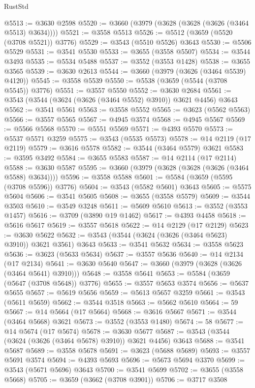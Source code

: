 \begin{lexlean}{RustStd}
\begin{coremodule}
@5513 := @3630 @2598
@5520 := @3660 (@3979 (@3628 (@3628 (@3626 (@3464 @5513) @3634))))
@5521 := @3558 @5513
@5526 := @5512 (@3659 (@5520 (@3708 @5521)) @3776)
@5529 := @3543 (@5510 @5526) @3643
@5530 := @5506 @5529
@5531 := @3541 @5530
@5533 := @3655 (@3558 @5507)
@5534 := @3544 @3493
@5535 := @5534 @5488
@5537 := @3552 (@3553 @1428)
@5538 := @3655 @3565
@5539 := @3630 @2613
@5544 := @3660 (@3979 (@3626 (@3464 @5539) @4120))
@5545 := @3558 @5539
@5550 := @5538 (@3659 (@5544 (@3708 @5545)) @3776)
@5551 := @3557 @5550
@5552 := @3630 @2684
@5561 := @3543 (@3544 (@3624 (@3626 (@3464 @5552) @3910)) @3621 @4456) @3643
@5562 := @3541 @5561
@5563 := @3558 @5552
@5565 := @3623 (@5562 @5563)
@5566 := @3557 @5565
@5567 := @4945 @3574
@5568 := @4945 @5567
@5569 := @5566 @5568
@5570 := @5551 @5569
@5571 := @4393 @5570
@5573 := @5537 @5571 @3259
@5575 := @3543 (@5535 @5573)
@5578 := @14 @2119 (@17 @2119)
@5579 := @3616 @5578
@5582 := @3544 (@3464 @5579) @3621
@5583 := @3595 @3492
@5584 := @3655 @5583
@5587 := @14 @2114 (@17 @2114)
@5588 := @3630 @5587
@5595 := @3660 (@3979 (@3628 (@3628 (@3626 (@3464 @5588) @3634))))
@5596 := @3558 @5588
@5601 := @5584 (@3659 (@5595 (@3708 @5596)) @3776)
@5604 := @3543 (@5582 @5601) @3643
@5605 := @5575 @5604
@5606 := @3541 @5605
@5608 := @3655 (@3558 @5579)
@5609 := @3544 @3503
@5610 := @3549 @3248
@5611 := @5609 @5610
@5613 := @3552 (@3553 @1457)
@5616 := @3709 (@3890 @19 @1462)
@5617 := @4393 @4458
@5618 := @5616 @5617
@5619 := @3557 @5618
@5622 := @14 @2129 (@17 @2129)
@5623 := @3630 @5622
@5632 := @3543 (@3544 (@3624 (@3626 (@3464 @5623) @3910)) @3621 @3561) @3643
@5633 := @3541 @5632
@5634 := @3558 @5623
@5636 := @3623 (@5633 @5634)
@5637 := @3557 @5636
@5640 := @14 @2134 (@17 @2134)
@5641 := @3630 @5640
@5647 := @3660 (@3979 (@3628 (@3626 (@3464 @5641) @3910)))
@5648 := @3558 @5641
@5653 := @5584 (@3659 (@5647 (@3708 @5648)) @3776)
@5655 := @3557 @5653 @3574
@5656 := @5637 @5655
@5657 := @5619 @5656
@5659 := @5613 @5657 @3259
@5661 := @3543 (@5611 @5659)
@5662 := @3544 @3518
@5663 := @5662 @5610
@5664 := 59
@5667 := @14 @5664 (@17 @5664)
@5668 := @3616 @5667
@5671 := @3544 (@3464 @5668) @3621
@5673 := @3552 (@3553 @1480)
@5674 := 58
@5677 := @14 @5674 (@17 @5674)
@5678 := @3630 @5677
@5687 := @3543 (@3544 (@3624 (@3626 (@3464 @5678) @3910)) @3621 @4456) @3643
@5688 := @3541 @5687
@5689 := @3558 @5678
@5691 := @3623 (@5688 @5689)
@5693 := @3557 @5691 @3574
@5694 := @4393 @5693
@5696 := @5673 @5694 @3370
@5699 := @3543 (@5671 @5696) @3643
@5700 := @3541 @5699
@5702 := @3655 (@3558 @5668)
@5705 := @3659 (@3662 (@3708 @3901))
@5706 := @3717 @3508

\end{coremodule}
\end{lexlean}
